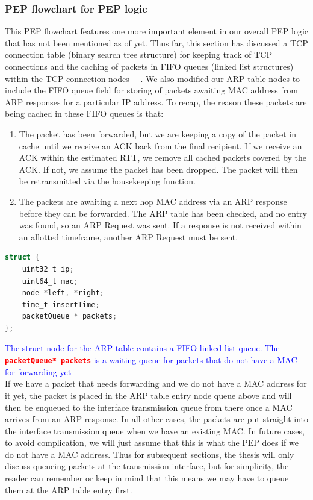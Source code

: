 \subsubsection{PEP flowchart for PEP logic}
This PEP flowchart features one more important element in our overall PEP logic that has not been mentioned as of yet. Thus far, this section has discussed a TCP connection table (binary search tree structure) for keeping track of TCP connections and the caching of packets in FIFO queues (linked list structures) within the TCP connection nodes ~\cite{42}~\cite{43}. We also modified our ARP table nodes to include the FIFO queue field for storing of packets awaiting MAC address from ARP responses for a particular IP address. To recap, the reason these packets are being cached in these FIFO queues is that: \\
\begin{enumerate}

\item The packet has been forwarded, but we are keeping a copy of the packet in cache until we receive an ACK back from the final recipient. If we receive an ACK within the estimated RTT, we remove all cached packets covered by the ACK. If not, we assume the packet has been dropped. The packet will then be retransmitted via the housekeeping function. \\
\item The packets are awaiting a next hop MAC address via an ARP response before they can be forwarded. The ARP table has been checked, and no entry was found, so an ARP Request was sent. If a response is not received within an allotted timeframe, another ARP Request must be sent. \\

\end{enumerate}

\begin{lstlisting}[language=C]
struct {
    uint32_t ip;
    uint64_t mac;
    node *left, *right;
    time_t insertTime;
    packetQueue * packets;
};
\end{lstlisting}

\noindent \textcolor{blue}{The struct node for the ARP table contains a FIFO linked list queue. The \textbf{\textcolor{red}{{\tt packetQueue* packets}}} is a waiting queue for packets that do not have a MAC for forwarding yet}\\


If we have a packet that needs forwarding and we do not have a MAC address for it yet, the packet is placed in the ARP table entry node queue above and will then be enqueued to the interface transmission queue from there once a MAC arrives from an ARP response. In all other cases, the packets are put straight into the interface transmission queue when we have an existing MAC. In future cases, to avoid complication, we will just assume that this is what the PEP does if we do not have a MAC address. Thus for subsequent sections, the thesis will only discuss queueing packets at the transmission interface, but for simplicity, the reader can remember or keep in mind that this means we may have to queue them at the ARP table entry first.\\


